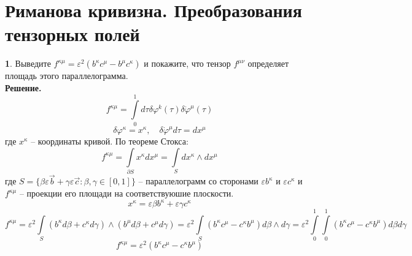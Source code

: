 \documentclass[12pt]{article}
\theoremstyle{definition}
\newtheorem{zad}{}[section]
\begin{document}
\section{Риманова кривизна. Преобразования тензорных полей}
\begin{zad}
Выведите $f^{\kappa\mu}=\varepsilon^2(b^\kappa c^\mu-b^\mu c^\kappa)$ и покажите, что тензор $f^{\mu\nu}$ определяет площадь этого параллелограмма.\\
\textbf{Решение.}\\
\begin{equation}
    f^{\kappa\mu}=\int\limits_0^1d\tau\delta\varphi^k(\tau)\delta\dot{\varphi}^\mu(\tau)
\end{equation}
\begin{equation}
    \delta\varphi^\kappa=x^\kappa,\quad \delta\dot{\varphi}^\mu d\tau=dx^\mu
\end{equation}
где $x^\kappa$ -- координаты кривой. По теореме Стокса:
\begin{equation}
    f^{\kappa\mu}=\int\limits_{\partial S} x^\kappa dx^\mu=\int\limits_S dx^\kappa\wedge dx^\mu
\end{equation}
где $S=\{\beta\varepsilon\vec{b}+\gamma\varepsilon\vec{c}:\beta,\gamma\in[0,1]\}$ -- параллелограмм со сторонами $\varepsilon b^\kappa$ и $\varepsilon c^\kappa$ и $f^{\kappa\mu}$ -- проекции его площади на соответствуюшие плоскости.
\begin{equation}
    x^\kappa=\varepsilon\beta b^\kappa+\varepsilon\gamma c^\kappa
\end{equation}
\begin{equation*}
    f^{\kappa\mu}=\varepsilon^2\int\limits_S (b^\kappa d\beta+c^\kappa d\gamma)\wedge(b^\mu d\beta+c^\mu d\gamma)=\varepsilon^2\int\limits_S (b^\kappa c^\mu-c^\kappa b^\mu)d\beta\wedge d\gamma=\varepsilon^2\int\limits_0^1\int\limits_0^1 (b^\kappa c^\mu-c^\kappa b^\mu)d\beta d\gamma
\end{equation*}
\begin{equation}
    \boxed{f^{\kappa\mu}=\varepsilon^2(b^\kappa c^\mu-c^\kappa b^\mu)}
\end{equation}
\end{zad}
\end{document}
